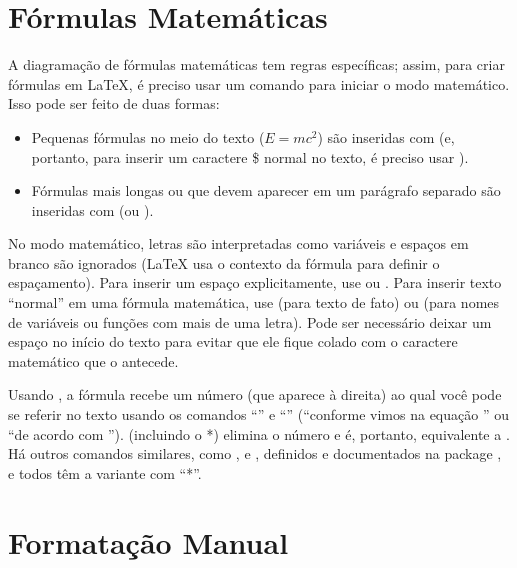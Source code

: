 \section{Fórmulas Matemáticas}

\enlargethispage{-.5\baselineskip}

A diagramação de fórmulas matemáticas tem regras específicas; assim, para
criar fórmulas em \LaTeX{}, é preciso usar um comando para iniciar o modo
matemático. Isso pode ser feito de duas formas:

\begin{itemize}
  \item Pequenas fórmulas no meio do texto ($E=mc^2$) são inseridas com
   (e, portanto, para inserir um caractere \$
  normal no texto, é preciso usar \cmd{\sla{}\$}).

  \item Fórmulas mais longas ou que devem aparecer em um parágrafo
  separado são inseridas com  (ou
  ).
\end{itemize}

No modo matemático, letras são interpretadas como variáveis e espaços
em branco são ignorados (\LaTeX{} usa o contexto da fórmula para
definir o espaçamento). Para inserir um espaço explicitamente, use
 ou . Para inserir texto ``normal'' em
uma fórmula matemática, use  (para texto de fato)
ou  (para nomes de variáveis ou funções com
mais de uma letra). Pode ser necessário deixar um espaço no início do
texto para evitar que ele fique colado com o caractere matemático que
o antecede.

Usando , a fórmula recebe um número (que
aparece à direita) ao qual você pode se referir no texto usando os
comandos ``'' e ``'' (``\textsf{conforme
vimos na equação }'' ou
``\textsf{de acordo com }'').
 (incluindo o *) elimina o número e é,
portanto, equivalente a . Há outros
comandos similares, como ,  e ,
definidos e documentados na package , e todos têm
a variante com ``*''.

\section{Formatação Manual}

